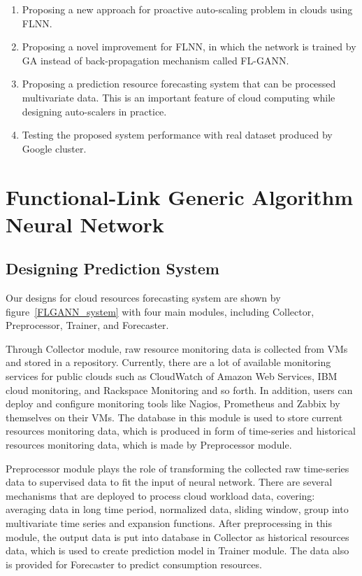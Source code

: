 \documentclass[conference]{IEEEtran}
\begin{document}
\begin{enumerate}
	\item Proposing a new approach for proactive auto-scaling problem in clouds using FLNN.
	\item Proposing a novel improvement for FLNN, in which the network is trained by GA instead of back-propagation mechanism called FL-GANN. 
	\item Proposing a prediction resource forecasting system that can be processed multivariate data. This is an important feature of cloud computing while designing auto-scalers in practice.
	\item Testing the proposed system performance with real dataset produced by Google cluster.
\end{enumerate}

\section{Functional-Link Generic Algorithm Neural Network}
\label{fl_gann}
\subsection{Designing Prediction System}
\label{designing_system}

Our designs for cloud resources forecasting system are shown by figure~\ref{FLGANN_system} with four main modules, including Collector, Preprocessor, Trainer, and Forecaster.

Through Collector module, raw resource monitoring data is collected from VMs and stored in a repository. Currently, there are a lot of available monitoring services for public clouds such as CloudWatch of Amazon Web Services, IBM cloud monitoring, and Rackspace Monitoring and so forth. In addition, users can deploy and configure monitoring tools like Nagios, Prometheus and Zabbix by themselves on their VMs. The database in this module is used to store current resources monitoring data, which is produced in form of time-series and historical resources monitoring data, which is made by Preprocessor module. 

Preprocessor module plays the role of transforming the collected raw time-series data to supervised data to fit the input of neural network. There are several mechanisms that are deployed to process cloud workload data, covering: averaging data in long time period, normalized data, sliding window, group into multivariate time series and expansion functions. After preprocessing in this module, the output data is put into database in Collector as historical resources data, which is used to create prediction model in Trainer module. The data also is provided for Forecaster to predict consumption resources. 
\end{document}
